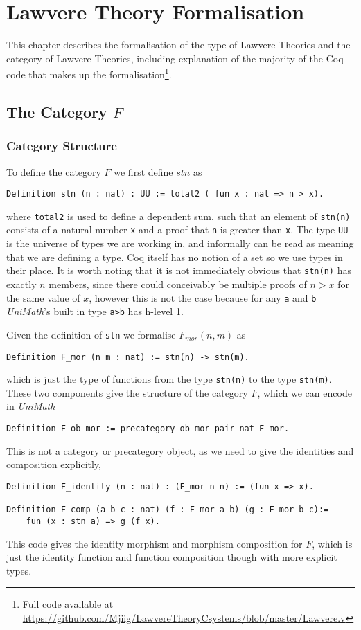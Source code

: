 \chapter{Lawvere Theory Formalisation}
This chapter describes the formalisation of the type of Lawvere Theories and the
category of Lawvere Theories, including explanation of the majority of the Coq
code that makes up the formalisation\footnote{Full code available at
\url{https://github.com/Mjiig/LawvereTheoryCsystems/blob/master/Lawvere.v}}.

\section{The Category $F$}
\subsection{Category Structure}
To define the category $F$ we first define $stn$ as
\begin{lstlisting}
Definition stn (n : nat) : UU := total2 ( fun x : nat => n > x).
\end{lstlisting}
where \lstinline|total2| is used to define a dependent sum, such that an element
of \lstinline|stn(n)| consists of a natural number \lstinline|x| and a proof
that \lstinline|n| is greater than \lstinline|x|. The type \lstinline|UU| is the
universe of types we are working in, and informally can be read as meaning that
we are defining a type. Coq itself has no notion of a set so we use types in
their place. It is worth noting that it is not immediately obvious that
\lstinline|stn(n)| has exactly $n$ members, since there could conceivably be
multiple proofs of $n>x$ for the same value of $x$, however this is not the case
because for any \lstinline|a| and \lstinline|b| \textit{UniMath}'s built in type
\lstinline|a>b| has h-level 1.

Given the definition of \lstinline|stn| we formalise $F_{mor}(n,m)$ as
\begin{lstlisting}
Definition F_mor (n m : nat) := stn(n) -> stn(m).
\end{lstlisting}
which is just the type of functions from the type \lstinline|stn(n)| to the type
\lstinline|stn(m)|. These two components give the structure of the category $F$,
which we can encode in \textit{UniMath}
\begin{lstlisting}
Definition F_ob_mor := precategory_ob_mor_pair nat F_mor.
\end{lstlisting}

This is not a category or precategory object, as we need to give the identities
and composition explicitly,
\begin{lstlisting}
Definition F_identity (n : nat) : (F_mor n n) := (fun x => x).

Definition F_comp (a b c : nat) (f : F_mor a b) (g : F_mor b c):=
    fun (x : stn a) => g (f x).
\end{lstlisting}
This code gives the identity morphism and morphism composition for $F$, which is
just the identity function and function composition though with more explicit
types.

